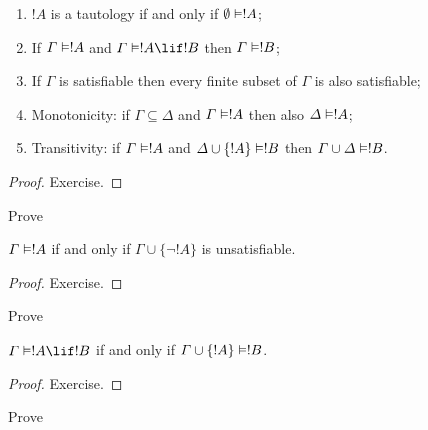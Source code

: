 \documentclass[../../../include/open-logic-section]{subfiles}
\begin{document}
\begin{prop}
\begin{enumerate} 
\item $!A$ is a tautology if and only if
  $\emptyset \Entails !A$; 
\item If $\Gamma \Entails !A$ and $\Gamma \Entails !A \lif !B$ then
  $\Gamma \Entails !B$;
\item If $\Gamma$ is satisfiable then every finite subset of $\Gamma$
  is also satisfiable; 
\item {} Monotonicity: if $\Gamma \subseteq \Delta$
  and $\Gamma \Entails !A$ then also $\Delta \Entails !A$;
\item {} Transitivity: if $\Gamma \Entails !A$ and
  $\Delta \cup \{ !A\} \Entails !B$ then $\Gamma \cup \Delta \Entails
  !B$.
\end{enumerate}
\end{prop}

\begin{proof}
Exercise.
\end{proof}

\begin{prob}
Prove 
\end{prob}

\begin{prop}
  $\Gamma \Entails !A$ if and only if $\Gamma \cup \{\lnot !A\}$
  is unsatisfiable.
\end{prop}

\begin{proof}
Exercise.
\end{proof}

\begin{prob}
Prove 
\end{prob}

\begin{thm}
   $\Gamma \Entails !A \lif !B$ if and only
  if $\Gamma \cup \{!A\} \Entails !B$.
\end{thm}

\begin{proof}
Exercise.
\end{proof}

\begin{prob}
Prove 
\end{prob}
\end{document}
